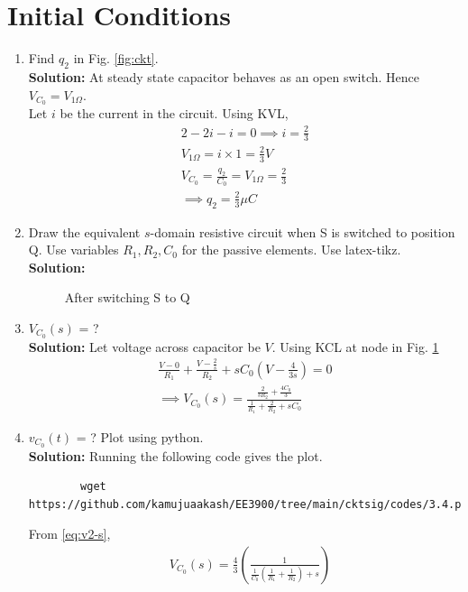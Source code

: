 \documentclass[journal,12pt,twocolumn]{IEEEtran}
\newcommand{\solution}{\noindent \textbf{Solution: }}
\providecommand{\brak}[1]{\ensuremath{\left(#1\right)}}
\numberwithin{equation}{section}
\renewcommand\thesection{\arabic{section}}
\begin{document}
 \section{Initial Conditions}
\begin{enumerate}[label=\arabic*.,ref=\thesection.\theenumi]
\item Find $q_2$ in Fig. \ref{fig:ckt}.\\
			\solution At steady state capacitor behaves as an open switch. Hence $V_{C_0}=V_{1 \Omega}$.\\
			Let $i$ be the current in the circuit. Using KVL,
			\begin{align}
				2-2i-i=0 \implies i=\frac{2}{3}\\
				V_{1 \Omega}=i \times 1= \frac{2}{3} V\\
			V_{C_0}=\frac{q_2}{C_0}=V_{1 \Omega}=\frac{2}{3}\\
			\implies q_2=\frac{2}{3} \mu C
			\end{align}
\item Draw the equivalent $s$-domain resistive circuit when S is switched to position Q.  Use variables $R_1, R_2, C_0$ for the passive elements.
Use latex-tikz.
		\label{prob:init}
		\\\solution 
	\begin{figure}[!ht]
 \centering

\caption{After switching S to Q}
\label{fig:sq}
\end{figure}
		\item $V_{C_0}(s)$ = ? \\
		\solution Let voltage across capacitor be $V$. Using KCL at node in Fig. \ref{fig:sq}
\begin{align}
    \frac{V - 0}{R_1} + \frac{V - \frac{2}{s}}{R_2} + sC_0\brak{V - \frac{4}{3s}} = 0 \\
\implies V_{C_0}(s) = \frac{\frac{2}{sR_2} + \frac{4C_0}{3}}{\frac{1}{R_1} + \frac{2}{R_2} + sC_0}
\label{eq:v2-s}
\end{align} 
	\item $v_{C_0}(t)$ = ? Plot using python.\\
	\solution Running the following code gives the plot.
	\begin{lstlisting}
		wget https://github.com/kamujuaakash/EE3900/tree/main/cktsig/codes/3.4.py
	\end{lstlisting}
	From \eqref{eq:v2-s},
\begin{align}
    &V_{C_0}(s) = \frac{4}{3}\brak{\frac{1}{\frac{1}{C_0}\brak{\frac{1}{R_1} + \frac{1}{R_2}}+s}} \nonumber \\

\end{align}
\end{enumerate}
\end{document}
